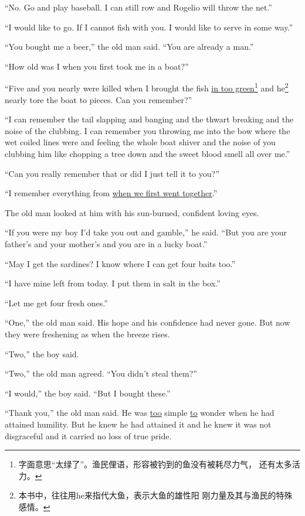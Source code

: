 \documentclass[fontset=ubuntu,zihao=-4]{ctexrep}
\begin{document}
``No. Go and play baseball. I can \gls{still} \gls{row} and Rogelio will \gls{throw} the net.''

``I would like to go. If I cannot fish with you. I would like to \gls{serve} in some way.''

``You bought me a beer,'' the old man said. ``You are already a man.''

``How old was I when you first took me in a boat?''

``Five and you nearly were killed when I brought the fish \uline{in too
  green}\footnote{字面意思“太绿了”。渔民俚语，形容被钓到的鱼没有被耗尽力气，
  还有太多活力。} and he\footnote{本书中，往往用he来指代大鱼，表示大鱼的雄性阳
  刚力量及其与渔民的特殊感情。} nearly \gls{tore} the boat to pieces. Can
you remember?''

``I can remember the tail \gls{slapping} and \gls{banging} and the \gls{thwart}
breaking and the noise of the \gls{clubbing}. I can remember you throwing me into
the \gls{bow} where the wet coiled lines were and feeling the whole boat \gls{shiver}
and the noise of you \gls{clubbing} him like \gls{chopping} a tree down and the \gls{sweet}
blood smell all \gls{over} me.''

``Can you really remember that or did I just tell it to you?''

``I remember everything from \uline{when we first went together}.''

The old man looked at him with his sun-burned, \gls{confident} loving eyes.

``If you were my boy I'd take you out and \gls{gamble},'' he said. ``But you are your father's and your mother's and you are in a lucky boat.''

``May I get the sardines? I know where I can get four \glspl{bait} too.''

``I have mine left from today. I put them in salt in the box.''

``Let me get four fresh ones.''

``One,'' the old man said. His hope and his \gls{confidence} had never gone. But now they were \gls{freshening} as when the \gls{breeze} \glspl{rise}.

``Two,'' the boy said.

``Two,'' the old man agreed. ``You didn't \gls{steal} them?''

``I would,'' the boy said. ``But I bought these.''

``Thank you,'' the old man said. He was \uline{too} simple \uline{to}
\gls{wonder} when he had \gls{attained} \gls{humility}. But he knew he had
attained it and he knew it was not \gls{disgraceful} and it carried no loss
of true \gls{pride}.
\end{document}
